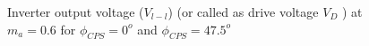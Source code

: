 \documentclass[journal]{IEEEtran}
\begin{document}
\begin{figure}[h]
\centering
{}
 \caption{Inverter output voltage ($V_{l-l}$) (or called as drive voltage $V_{D}$ ) at $m_a =0.6$ for $\phi_{CPS}=0^o$ and $\phi_{CPS}=47.5^o$}
    \label{fig:multi-freq}
\end{figure}
\vspace*{-5mm}
\end{document}
